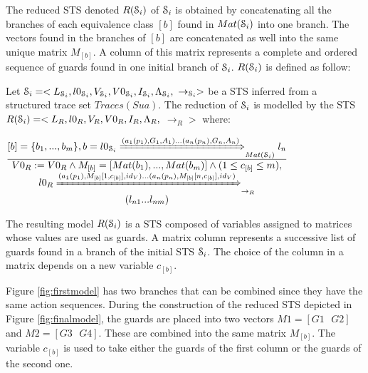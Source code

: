 The reduced STS denoted $R(\EuScript{S}_i)$ of $\EuScript{S}_i$
is obtained by concatenating all the branches of each equivalence
class $[b]$ found in $Mat(\EuScript{S}_i)$ into one branch. The
vectors found in the branches of $[b]$ are concatenated as well
into the same unique matrix $M_{[b]}$. A column of this matrix
represents a complete and ordered sequence of guards found in one
initial branch of $\EuScript{S}_i$. $R(\EuScript{S}_i)$ is
defined as follow:

\begin{definition}
	\label{rule:min}

	Let $\EuScript{S}_i=<L_{\EuScript{S}_i},l0_{\EuScript{S}_i},V_{\EuScript{S}_i},V0_{\EuScript{S}_i},I_{\EuScript{S}_i},\Lambda_{\EuScript{S}_i},$ $\rightarrow_{\EuScript{S}_i}>$ be
    a STS inferred from a structured trace set $Traces(Sua)$. The reduction of $\EuScript{S}_i$ is modelled by the STS
	$R(\EuScript{S}_i)= <L_R,l0_R,V_R,V0_R,I_R,\Lambda_R,$
	$\rightarrow_R>$ where:

  \begin{center}
  $\frac{\begin{matrix}
      [b]=\{b_1,...,b_m\},
      b=l0_{\EuScript{S}_i} \xRightarrow{(a_1(p_1),G_{1},A_{1})...(a_n(p_n),G_{n},A_{n})}_{Mat(\EuScript{S}_i)} l_{n}\\
    \end{matrix}
  }
  {\begin{matrix}
      V0_R:=V0_R \wedge M_{[b]}=[Mat(b_1),...,Mat(b_m)] \wedge (1 \leq c_{[b]} \leq m),\\
      l0_R \xRightarrow{(a_1(p_1),M_{[b]}[1,c_{[b]}],id_V)... (a_n(p_n),M_{[b]}[n,c_{[b]}],id_V)}_{\rightarrow_R}\\  (l_{n1}...l_{nm})
    \end{matrix}
  }$
  \end{center}
\end{definition}

The resulting model $R(\EuScript{S}_i)$ is a STS composed of
variables assigned to matrices whose values are used as guards. A
matrix column represents a successive list of guards found in a
branch of the initial STS $\EuScript{S}_i$. The choice of the
column in a matrix depends on a new variable $c_{[b]}$.

Figure \ref{fig:firstmodel} has two branches that can be combined
since they have the same action sequences. During the
construction of the reduced STS depicted in Figure
\ref{fig:finalmodel}, the guards are placed into two vectors
$M1=[G1\text{ }G2]$ and $M2=[G3\text{ }G4]$.  These are combined
into the same matrix $M_{[b]}$. The variable $c_{[b]}$ is used to
take either the guards of the first column or the guards of the
second one.

